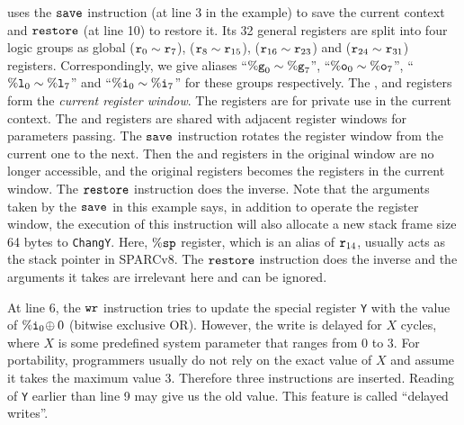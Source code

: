 \sparc{} uses the $\texttt{save}$ instruction (at line 3 in the example)
to save the current context
and $\texttt{restore}$ (at line 10) to restore it.
Its 32 general registers are split into four
logic groups
as \textsf{global} ($\texttt{r}_{0} \sim \texttt{r}_{7}$),
\outRN{} ($\texttt{r}_{8} \sim \texttt{r}_{15}$),
\localRN{} ($\texttt{r}_{16} \sim \texttt{r}_{23}$) and
\inRN{} ($\texttt{r}_{24} \sim \texttt{r}_{31}$) registers.
Correspondingly, we give aliases ``$\%\texttt{g}_{0} \sim \%\texttt{g}_{7}$'',
``$\%\texttt{o}_{0} \sim \%\texttt{o}_{7}$'', ``$\%\texttt{l}_{0} \sim \%\texttt{l}_{7}$''
and ``$\%\texttt{i}_{0} \sim \%\texttt{i}_{7}$'' for these groups
respectively.
The \outRN{}, \localRN{} and \inRN{} registers form the
{\em current register window}.
The \localRN{} registers are for private use in the current context.
The \inRN{} and \outRN{} registers are shared with adjacent register windows
for parameters passing.
The $\texttt{save}$ instruction rotates the register window from the
current one to the next. Then the \localRN{} and \inRN{}
registers in the original window are no longer accessible,
and the original \outRN{} registers becomes the \inRN{} registers
in the current window.
The $\texttt{restore}$ instruction does the inverse.
Note that the arguments taken by the $\texttt{save}{}$ 
in this example says, 
in addition to operate the register window,  
the execution of this instruction will also 
allocate a new stack frame size 64 bytes 
to \texttt{ChangY}. Here, $\%\texttt{sp}$ register, 
which is an alias of $\texttt{r}_{14}$, usually 
acts as the stack pointer in SPARCv8. 
The $\texttt{restore}{}$ instruction does the inverse 
and the arguments it takes are irrelevant here 
and can be ignored.  


At line 6, the $\texttt{wr}$ instruction tries to
update the special register {\tt Y}
with the value of $\%\texttt{i}_{0} \! \oplus 0$ 
(bitwise exclusive OR).
However, the write is delayed for $X$ cycles, 
where $X$ is some predefined system parameter 
that ranges from 0 to 3.
For portability, programmers usually do not rely
on the exact value of $X$ and assume it takes
the maximum value 3.
Therefore three \nop{} instructions
are inserted.
Reading of {\tt Y} earlier than line 9
may give us the old value.
This feature is called ``delayed writes''.


